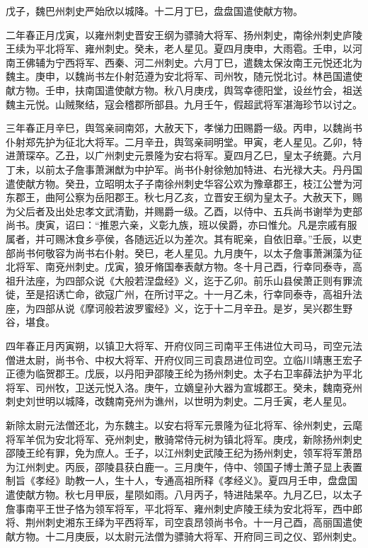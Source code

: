 \documentclass[12pt,UTF8]{ctexbook}
\begin{document}
戊子，魏巴州刺史严始欣以城降。十二月丁巳，盘盘国遣使献方物。

二年春正月戊寅，以雍州刺史晋安王纲为骠骑大将军、扬州刺史，南徐州刺史庐陵王续为平北将军、雍州刺史。癸未，老人星见。夏四月庚申，大雨雹。壬申，以河南王佛辅为宁西将军、西秦、河二州刺史。六月丁巳，遣魏太保汝南王元悦还北为魏主。庚申，以魏尚书左仆射范遵为安北将军、司州牧，随元悦北讨。林邑国遣使献方物。壬申，扶南国遣使献方物。秋八月庚戌，舆驾幸德阳堂，设丝竹会，祖送魏主元悦。山贼聚结，寇会稽郡所部县。九月壬午，假超武将军湛海珍节以讨之。

三年春正月辛巳，舆驾亲祠南郊，大赦天下，孝悌力田赐爵一级。丙申，以魏尚书仆射郑先护为征北大将军。二月辛丑，舆驾亲祠明堂。甲寅，老人星见。乙卯，特进萧琛卒。乙丑，以广州刺史元景隆为安右将军。夏四月乙巳，皇太子统薨。六月丁未，以前太子詹事萧渊猷为中护军。尚书仆射徐勉加特进、右光禄大夫。丹丹国遣使献方物。癸丑，立昭明太子子南徐州刺史华容公欢为豫章郡王，枝江公誉为河东郡王，曲阿公察为岳阳郡王。秋七月乙亥，立晋安王纲为皇太子。大赦天下，赐为父后者及出处忠孝文武清勤，并赐爵一级。乙酉，以侍中、五兵尚书谢举为吏部尚书。庚寅，诏曰：“推恩六亲，义彰九族，班以侯爵，亦曰惟允。凡是宗戚有服属者，并可赐沐食乡亭侯，各随远近以为差次。其有昵亲，自依旧章。”壬辰，以吏部尚书何敬容为尚书右仆射。癸巳，老人星见。九月庚午，以太子詹事萧渊藻为征北将军、南兗州刺史。戊寅，狼牙脩国奉表献方物。冬十月己酉，行幸同泰寺，高祖升法座，为四部众说《大般若涅盘经》义，迄于乙卯。前乐山县侯萧正则有罪流徙，至是招诱亡命，欲寇广州，在所讨平之。十一月乙未，行幸同泰寺，高祖升法座，为四部从说《摩诃般若波罗蜜经》义，讫于十二月辛丑。是岁，吴兴郡生野谷，堪食。

四年春正月丙寅朔，以镇卫大将军、开府仪同三司南平王伟进位大司马，司空元法僧进太尉，尚书令、中权大将军、开府仪同三司袁昂进位司空。立临川靖惠王宏子正德为临贺郡王。戊辰，以丹阳尹邵陵王纶为扬州刺史。太子右卫率薛法护为平北将军、司州牧，卫送元悦入洛。庚午，立嫡皇孙大器为宣城郡王。癸未，魏南兗州刺史刘世明以城降，改魏南兗州为谯州，以世明为刺史。二月壬寅，老人星见。

新除太尉元法僧还北，为东魏主。以安右将军元景隆为征北将军、徐州刺史，云麾将军羊侃为安北将军、兗州刺史，散骑常侍元树为镇北将军。庚戌，新除扬州刺史邵陵王纶有罪，免为庶人。壬子，以江州刺史武陵王纪为扬州刺史，领军将军萧昂为江州刺史。丙辰，邵陵县获白鹿一。三月庚午，侍中、领国子博士萧子显上表置制旨《孝经》助教一人，生十人，专通高祖所释《孝经义》。夏四月壬申，盘盘国遣使献方物。秋七月甲辰，星陨如雨。八月丙子，特进陆杲卒。九月乙巳，以太子詹事南平王世子恪为领军将军，平北将军、雍州刺史庐陵王续为安北将军，西中郎将、荆州刺史湘东王绎为平西将军，司空袁昂领尚书令。十一月己酉，高丽国遣使献方物。十二月庚辰，以太尉元法僧为骠骑大将军、开府同三司之仪、郢州刺史。
\end{document}
